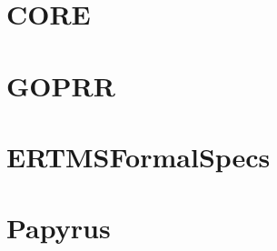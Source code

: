 \documentclass{template/openetcs_report}
\begin{document}
\newenvironment{justif}{
        \begin{quote}
        \begin{itshape}Justification.
}{
        \end{itshape}
        \end{quote}
}


\newenvironment{author_comment}{
        \begin{quote}
        \begin{itshape}\textcolor{green}{Author.}
}{
        \end{itshape}
        \end{quote}
}


\newenvironment{assessor1}{
        \begin{quote}
        \begin{itshape} \textcolor{blue}{Assessor 1.}
}{
        \end{itshape}
        \end{quote}
}


\newenvironment{assessor2}{
        \begin{quote}
        \begin{itshape}\textcolor{magenta}{Assessor 2.}
}{
        \end{itshape}
        \end{quote}
}


\def\reqt{R-WP2/D2.3.0}

\mainmatter








\appendix

\chapter{CORE}
\tbd

\chapter{GOPRR}
\tbd

\chapter{ERTMSFormalSpecs}
\tbd

\chapter{Papyrus}
\tbd
\end{document}

